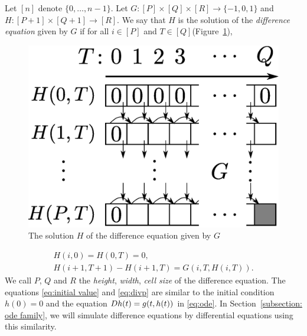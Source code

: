 Let $[n]$ denote $\{0, \dots , n-1\}$.
Let $G \colon [P] \times [Q] \times [R] \to \{-1, 0, 1\}$ and
$H \colon [P + 1] \times [Q+1] \to [R]$. 
We say that $H$ is the solution of the \emph{difference equation} given by $G$
if for all $i \in [P]$ and $T \in [Q]$(Figure~\ref{fig:divp}), 
\begin{figure}
 \begin{center}
  \includegraphics[height=0.15\textheight]{image/divp.eps}
 \end{center}
 \caption{The solution $H$ of the difference equation given by $G$}
 \label{fig:divp}
\end{figure}
\begin{gather}
   H(i, 0) = H(0, T) = 0, \label{eq:initial value}
\\
   H(i + 1, T + 1) - H(i+1, T) = G(i, T, H(i, T)).  \label{eq:divp}
\end{gather}
We call $P$, $Q$ and $R$ the \emph{height}, \emph{width}, \emph{cell size} of
the difference equation.
The equations \eqref{eq:initial value} and \eqref{eq:divp} are similar to 
the initial condition $h(0) = 0$ and the equation $D h(t) = g(t, h(t))$ 
in \eqref{eq:ode}.
In Section~\ref{subsection: ode family}, we will simulate difference equations by differential equations using this similarity.

